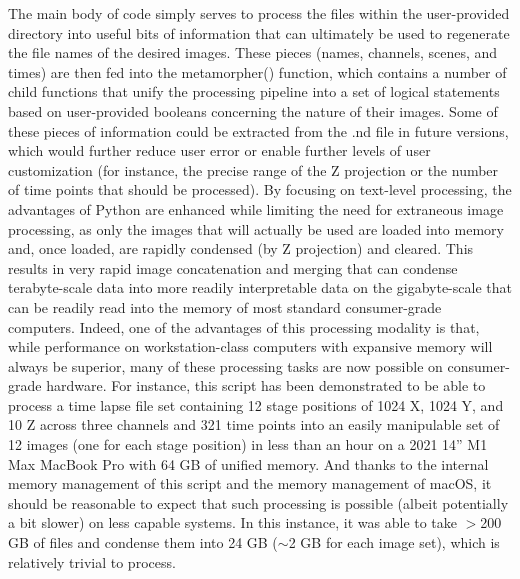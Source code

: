The main body of code simply serves to process the files within the user\hyp{}provided directory into useful bits of information that can ultimately be used to regenerate the file names of the desired images. These pieces (names, channels, scenes, and times) are then fed into the metamorpher() function, which contains a number of child functions that unify the processing pipeline into a set of logical statements based on user\hyp{}provided booleans concerning the nature of their images. Some of these pieces of information could be extracted from the .nd file in future versions, which would further reduce user error or enable further levels of user customization (for instance, the precise range of the Z projection or the number of time points that should be processed). By focusing on text\hyp{}level processing, the advantages of Python are enhanced while limiting the need for extraneous image processing, as only the images that will actually be used are loaded into memory and, once loaded, are rapidly condensed (by Z projection) and cleared. This results in very rapid image concatenation and merging that can condense terabyte\hyp{}scale data into more readily interpretable data on the gigabyte\hyp{}scale that can be readily read into the memory of most standard consumer\hyp{}grade computers. Indeed, one of the advantages of this processing modality is that, while performance on workstation\hyp{}class computers with expansive memory will always be superior, many of these processing tasks are now possible on consumer\hyp{}grade hardware. For instance, this script has been demonstrated to be able to process a time lapse file set containing 12 stage positions of 1024 X, 1024 Y, and 10 Z across three channels and 321 time points into an easily manipulable set of 12 images (one for each stage position) in less than an hour on a 2021 14'' M1 Max MacBook Pro with 64 GB of unified memory. And thanks to the internal memory management of this script and the memory management of macOS, it should be reasonable to expect that such processing is possible (albeit potentially a bit slower) on less capable systems. In this instance, it was able to take $>$200 GB of files and condense them into 24 GB ($\sim$2 GB for each image set), which is relatively trivial to process. 

